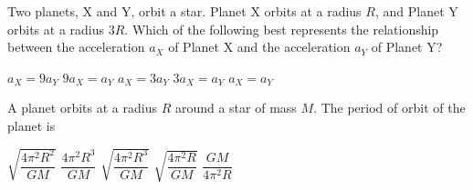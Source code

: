 \documentclass{../../../oss-classkick-exam}
\begin{document}
\begin{multicols*}{2}
\begin{questions}
    \question Two planets, X and Y, orbit a star. Planet X orbits at a radius
    $R$, and Planet Y orbits at a radius $3R$. Which of the following best
    represents the relationship between the acceleration $a_X$ of Planet X and
    the acceleration $a_Y$ of Planet Y?
    \begin{center}
    \end{center}
    \begin{choices}
      \choice $a_X = 9a_Y$
      \choice $9a_X = a_Y$
      \choice $a_X = 3a_Y$
      \choice $3a_X = a_Y$
      \choice $a_X = a_Y$
    \end{choices}

    
    \question A planet orbits at a radius $R$ around a star of mass $M$. The
    period of orbit of the planet is
    \begin{choices}
      \choice $\sqrt{\dfrac{4\pi^2R^2}{GM}}$
      \choice $\dfrac{4\pi^2R^3}{GM}$
      \choice $\sqrt{\dfrac{4\pi^2R^3}{GM}}$
      \choice $\sqrt{\dfrac{4\pi^2R}{GM}}$
      \choice $\dfrac{GM}{4\pi^2R}$
    \end{choices}


\end{questions}
\end{multicols*}
\end{document}

